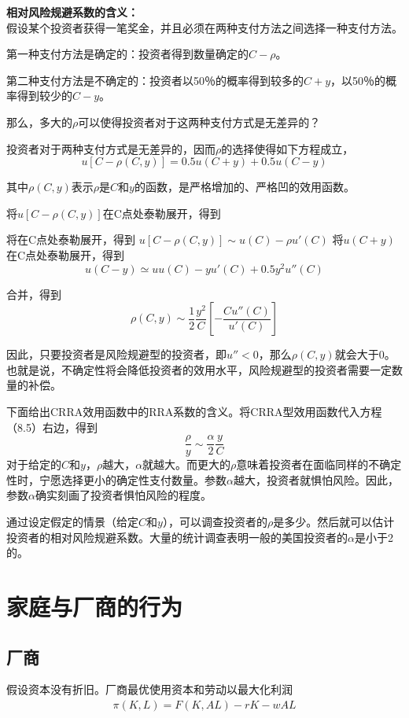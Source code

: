 \textbf{相对风险规避系数的含义：}\\
假设某个投资者获得一笔奖金，并且必须在两种支付方法之间选择一种支付方法。

第一种支付方法是确定的：投资者得到数量确定的$ C-\rho $。

第二种支付方法是不确定的：投资者以50％的概率得到较多的$ C+y $，以50％的概率得到较少的$ C-y $。

那么，多大的$ \rho $可以使得投资者对于这两种支付方式是无差异的？

投资者对于两种支付方式是无差异的，因而$ \rho $的选择使得如下方程成立，
\[u[C-\rho(C,y)] =0.5u(C+y)+0.5u(C-y)\]

其中$ \rho(C,y) $表示$ \rho $是$ C $和$ y $的函数，是严格增加的、严格凹的效用函数。

将$ u[C-\rho(C,y)] $在C点处泰勒展开，得到

将在C点处泰勒展开，得到
$ u[C-\rho(C,y)] \sim u(C)-\rho u'(C)$
将$ u(C+y) $在C点处泰勒展开，得到
\[u(C-y)\simeq u u(C)-yu'(C) +0.5y^2 u''(C)\]

合并，得到
\[\rho(C,y) \sim \dfrac{1}{2}\dfrac{y^2}{C}\left[
-\dfrac{Cu''(C)}{u'(C)}\right]\]


因此，只要投资者是风险规避型的投资者，即$ u''<0 $，那么$ \rho(C,y) $就会大于0。也就是说，不确定性将会降低投资者的效用水平，风险规避型的投资者需要一定数量的补偿。

下面给出CRRA效用函数中的RRA系数的含义。将CRRA型效用函数代入方程（8.5）右边，得到
\[\dfrac{\rho}{y}\sim \dfrac{\alpha}{2}\dfrac{y}{C}\]
对于给定的$ C $和$ y $，$ \rho $越大，$ \alpha $就越大。而更大的$ \rho $意味着投资者在面临同样的不确定性时，宁愿选择更小的确定性支付数量。参数$ \alpha $越大，投资者就惧怕风险。因此，参数$ \alpha $确实刻画了投资者惧怕风险的程度。

通过设定假定的情景（给定$ C $和$ y $），可以调查投资者的$ \rho $是多少。然后就可以估计投资者的相对风险规避系数。大量的统计调查表明一般的美国投资者的$ \alpha $是小于2的。

\section{家庭与厂商的行为}
\subsection{ 厂商}
假设资本没有折旧。厂商最优使用资本和劳动以最大化利润
\begin{gather}
	\pi(K,L)=F(K,AL)-rK-wAL
\end{gather}


